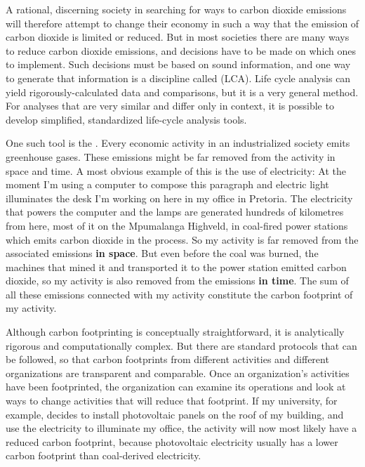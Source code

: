 A rational, discerning society in searching for ways to carbon dioxide emissions
will therefore attempt to change their economy in such a way that the emission
of carbon dioxide is limited or reduced. But in most societies there are many
ways to reduce carbon dioxide emissions, and decisions have to be made on which
ones to implement. Such decisions must be based on sound information, and one
way to generate that information is a discipline called  (LCA). Life cycle analysis can yield rigorously-calculated data and
comparisons, but it is a very general method. For analyses that are very similar
and differ only in context, it is possible to develop simplified, standardized
life-cycle analysis tools.

One such tool is the . Every economic activity in an
industrialized society emits greenhouse gases.
These emissions might  be far removed from the activity in space and time. A
most obvious example of this is the use of electricity: At the moment I'm using
a computer to compose this paragraph and electric light illuminates the desk I'm
working on here in my office in Pretoria. The electricity that powers the
computer and the lamps are generated hundreds of kilometres from here, most of
it on the Mpumalanga Highveld, in coal-fired power stations which emits carbon
dioxide in the process. So my activity is far removed from the associated
emissions \textbf{in space}. But even before the coal was burned, the machines
that mined it and transported it to the power station emitted carbon dioxide, so
my activity is also removed from the emissions \textbf{in time}. The sum of all
these emissions connected with my activity constitute the carbon footprint of my
activity.

Although carbon footprinting is conceptually straightforward, it is analytically
rigorous and computationally complex. But there are standard protocols
\autocite{WRI2004} that can be followed, so that carbon footprints from
different activities and different organizations are transparent and comparable.
Once an organization's activities have been footprinted, the organization can
examine its operations and look at ways to change activities that will reduce
that footprint. If my university, for example, decides to install photovoltaic
panels on the roof of my building, and use the electricity to illuminate my
office, the activity will now most likely have a reduced carbon footprint,
because photovoltaic electricity usually has a lower carbon footprint than
coal-derived electricity.

